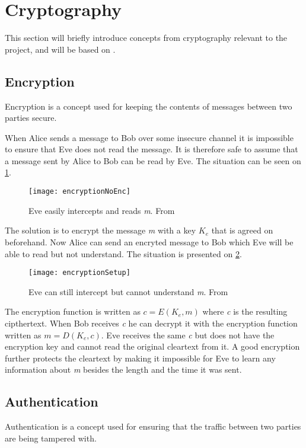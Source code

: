 \section{Cryptography}\label{cryptography}
This section will briefly introduce concepts from cryptography relevant to the project, and will be based on \cite{cryptoenginering}.

\subsection{Encryption}
Encryption is a concept used for keeping the contents of messages between two parties secure.

When Alice sends a message to Bob over some insecure channel it is impossible to ensure that Eve does not read the message.
It is therefore safe to assume that a message sent by Alice to Bob can be read by Eve.
The situation can be seen on \cref{crypto:noenc}.

\begin{figure}[H]
	\centering
	\texttt{[image: encryptionNoEnc]}
	\caption{Eve easily intercepts and reads \emph{m}. From \citet[p.~50]{cryptoenginering}}
	\label{crypto:noenc}
\end{figure}

The solution is to encrypt the message \emph{m} with a key $K_e$ that is agreed on beforehand.
Now Alice can send an encryted message to Bob which Eve will be able to read but not understand.
The situation is presented on \cref{crypto:enc}.

\begin{figure}[H]
	\centering
	\texttt{[image: encryptionSetup]}
	\caption{Eve can still intercept but cannot understand \emph{m}. From \citet[p.~50]{cryptoenginering}}
	\label{crypto:enc}
\end{figure}

The encryption function is written as $c = E(K_e,m)$ where \emph{c} is the resulting cipthertext.
When Bob receives \emph{c} he can decrypt it with the encryption function written as $m = D(K_e,c)$.
Eve receives the same \emph{c} but does not have the encryption key and cannot read the original cleartext from it.
A good encryption further protects the cleartext by making it impossible for Eve to learn any information about \emph{m} besides the length and the time it was sent.


\subsection{Authentication}
Authentication is a concept used for ensuring that the traffic between two parties are being tampered with.

